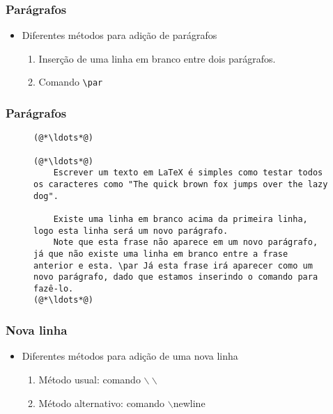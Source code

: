 \begin{frame} \frametitle{Parágrafos}
\begin{itemize}
	\item Diferentes métodos para adição de parágrafos
	\begin{enumerate}
		\item Inserção de uma linha em branco entre dois parágrafos.
		\item Comando \texttt{\textbackslash{}par}
	\end{enumerate}
\end{itemize}
\end{frame}

\begin{frame}[fragile] \frametitle{Parágrafos}
\begin{figure}[!t]
\begin{lstlisting}
(@*\ldots*@)

(@*\ldots*@)
	Escrever um texto em LaTeX é simples como testar todos os caracteres como "The quick brown fox jumps over the lazy dog".

	Existe uma linha em branco acima da primeira linha, logo esta linha será um novo parágrafo.
	Note que esta frase não aparece em um novo parágrafo, já que não existe uma linha em branco entre a frase anterior e esta. \par Já esta frase irá aparecer como um novo parágrafo, dado que estamos inserindo o comando para fazê-lo.
(@*\ldots*@)

\end{lstlisting}
\end{figure}
\end{frame}

\begin{frame}[fragile] \frametitle{Nova linha}
\begin{itemize}
	\item Diferentes métodos para adição de uma nova linha
	\begin{enumerate}
		\item Método usual: comando $\backslash\backslash$
		\item Método alternativo: comando $\backslash$newline
	\end{enumerate}
\end{itemize}
\end{frame}

